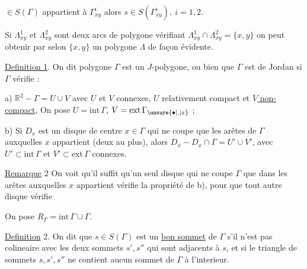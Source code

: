 $\in S(\Gamma)$ appartient à $\Gamma^{i}_{xy}$ alors $s\in S(\Gamma^{i}_{xy}),\ i=1,2$.

Si $\Lambda^{1}_{xy}$ et $\Lambda^{2}_{xy}$ sont deux arcs de polygone vérifiant \margin{$\bullet$}$\Lambda^{1}_{xy}\cap\Lambda^{2}_{xy}=\{x,y\}$ on peut obtenir par  selon $\{x,y\}$ un polygone $\Lambda$ de façon évidente.

%
\uline{Definition 1}. On dit  polygone $\Gamma$ est un $J$-polygone, ou bien que $\Gamma$ est de Jordan si $\Gamma$ vérifie :

a) $\mathbb{R}^{2}-\Gamma=U\cup V$ avec $U$ et $V$ connexes, $U$ relativement compact et \uline{$\overline{V}$ non-compact}, On pose $U=\mathrm{int}\,\Gamma$, $V=\mathrm{ext}\,\Gamma_{\unsure{\bullet|,|x}}$ ;

b) Si $D_{x}$ est un disque de centre $x\in\Gamma$ qui ne coupe que les arêtes de $\Gamma$ auxquelles $x$ appartient (deux au plus), alors $D_{x}-D_{x}\cap\Gamma=U'\cup V'$, avec $U'\subset\mathrm{int}\,\Gamma$ et $V'\subset\mathrm{ext}\,\Gamma$ connexes.

%
\uline{Remarque} 2 On voit qu'il suffit qu'un seul disque  qui ne coupe $\Gamma$  que dans les  arêtes auxquelles $x$ appartient vérifie la propriété de b), pour que tout autre  disque  vérifie 

On pose $R_{\Gamma}=\mathrm{int}\,\Gamma\cup\Gamma$.

\margin{$\cdot$}\uline{Definition} 2. On dit que $s\in S(\Gamma)$ est un \uline{bon sommet} de $\Gamma$ s'il \margin{,}n'est pas colineaire avec les deux sommets $s',s''$ qui sont adjacents à $s$, et si le triangle de sommets $s,s',s''$ ne contient aucun sommet de $\Gamma$ à l'interieur. 


